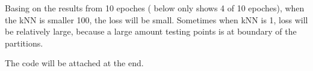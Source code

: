 \documentclass{article}
\begin{document}
\begin{figure}[h]
  \centering
  \qquad
  \qquad
  \qquad
\end{figure}

Basing on the results from 10 epoches ( below only shows 4 of 10 epoches), when the kNN is smaller 100,
the loss will be small. Sometimes when kNN is 1, loss will be relatively large, because a large amount testing points is at boundary of the partitions.

The code will be attached at the end.

\newpage
\end{document}
